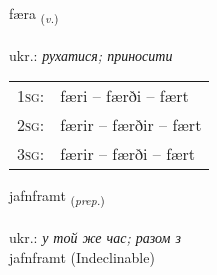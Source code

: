 \documentclass[frontgrid, backgrid]{flacards}\usepackage[]{graphicx}\usepackage[]{xcolor}
\begin{document}
\renewcommand{\blhead}{\vskip5pt {\small\bfseries\footnotesize Sagnorð | дієслово }}
\renewcommand{\bcfoot}{\vskip5pt \hspace{2pt}{\small\bfseries\footnotesize 1K}}


{færa \small{\textsubscript{(\textit{v.})}} \\[1ex] %
\textphonetic{[faiːra]} \\
ukr.: \emph{рухатися; приносити} \\  [2ex]
\renewcommand*{\arraystretch}{0.8}
\begin{tabular}{p{1cm}l}
\textsc{1sg}: & færi -- færði -- fært \\ 
\textsc{2sg}: & færir -- færðir -- fært \\ 
\textsc{3sg}: & færir -- færði -- fært \\ 
\end{tabular}
}


\renewcommand{\flhead}{\vskip5pt \fboxsep=0pt {\small\bfseries\footnotesize Forsetning | прийменник}}
\renewcommand{\fcfoot}{\vskip5pt \fboxsep=0pt \hspace{2pt}{\small\bfseries\footnotesize 1K}}

\renewcommand{\blhead}{\vskip5pt {\small\bfseries\footnotesize Forsetning | прийменник }}
\renewcommand{\bcfoot}{\vskip5pt \hspace{2pt}{\small\bfseries\footnotesize 1K}}


{jafnframt \small{\textsubscript{(\textit{prep.})}} \\[1ex]
 \\
ukr.: \emph{у той же час; разом з} \\  [2ex]
jafnframt (Indeclinable)}


\renewcommand{\flhead}{\vskip5pt \fboxsep=0pt {\small\bfseries\footnotesize Forsetning | прийменник}}
\renewcommand{\fcfoot}{\vskip5pt \fboxsep=0pt \hspace{2pt}{\small\bfseries\footnotesize 1K}}
\end{document}
